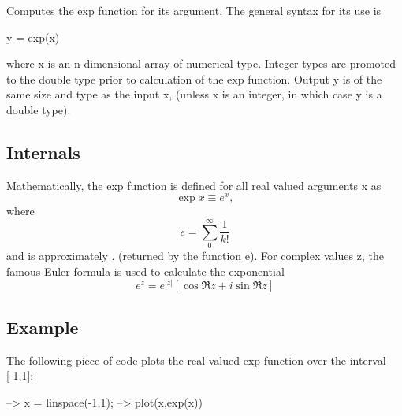 Computes the {\ttfamily exp} function for its argument. The general syntax for its use is \begin{DoxyVerb}   y = exp(x)
\end{DoxyVerb}
 where {\ttfamily x} is an {\ttfamily n}-\/dimensional array of numerical type. Integer types are promoted to the {\ttfamily double} type prior to calculation of the {\ttfamily exp} function. Output {\ttfamily y} is of the same size and type as the input {\ttfamily x}, (unless {\ttfamily x} is an integer, in which case {\ttfamily y} is a {\ttfamily double} type). \hypertarget{transforms_svd_Function}{}\subsection{Internals}\label{transforms_svd_Function}
Mathematically, the {\ttfamily exp} function is defined for all real valued arguments {\ttfamily x} as \[ \exp x \equiv e^{x}, \] where \[ e = \sum_{0}^{\infty} \frac{1}{k!} \] and is approximately {.} (returned by the function {\ttfamily e}). For complex values {\ttfamily z}, the famous Euler formula is used to calculate the exponential \[ e^{z} = e^{|z|} \left[ \cos \Re z + i \sin \Re z \right] \] \hypertarget{variables_struct_Example}{}\subsection{Example}\label{variables_struct_Example}
The following piece of code plots the real-\/valued {\ttfamily exp} function over the interval {\ttfamily \mbox{[}-\/1,1\mbox{]}}\-:


\begin{DoxyVerbInclude}
--> x = linspace(-1,1);
--> plot(x,exp(x))
\end{DoxyVerbInclude}


